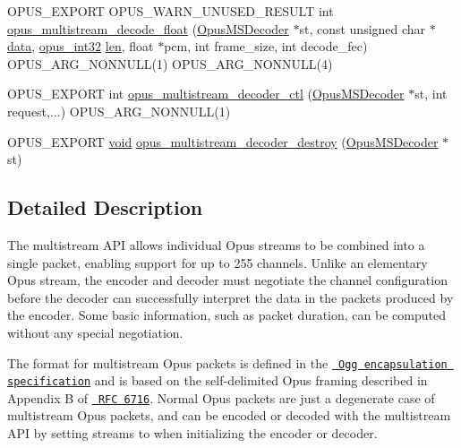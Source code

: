 \begin{DoxyCompactItemize}
\item 
O\+P\+U\+S\+\_\+\+E\+X\+P\+O\+RT O\+P\+U\+S\+\_\+\+W\+A\+R\+N\+\_\+\+U\+N\+U\+S\+E\+D\+\_\+\+R\+E\+S\+U\+LT int \mbox{\hyperlink{group__opus__multistream_ga32b004586f69b063a447e123e6a2c151}{opus\+\_\+multistream\+\_\+decode\+\_\+float}} (\mbox{\hyperlink{group__opus__multistream_gad3497495deb9a8ace82e76cd4f93e0e4}{Opus\+M\+S\+Decoder}} $\ast$st, const unsigned char $\ast$\mbox{\hyperlink{_s_d_l__opengl_8h_a2e335d56e2846b0fea47eed068b2d34a}{data}}, \mbox{\hyperlink{opus__types_8h_aa4d309d6f80b99dbabebc8f98879ab9a}{opus\+\_\+int32}} \mbox{\hyperlink{_s_d_l__opengl__glext_8h_a652168017ea9a8bbcead03d5c16269fb}{len}}, float $\ast$pcm, int frame\+\_\+size, int decode\+\_\+fec) O\+P\+U\+S\+\_\+\+A\+R\+G\+\_\+\+N\+O\+N\+N\+U\+LL(1) O\+P\+U\+S\+\_\+\+A\+R\+G\+\_\+\+N\+O\+N\+N\+U\+LL(4)
\item 
O\+P\+U\+S\+\_\+\+E\+X\+P\+O\+RT int \mbox{\hyperlink{group__opus__multistream_ga3c6402c3bb276d7a152d9934ce948431}{opus\+\_\+multistream\+\_\+decoder\+\_\+ctl}} (\mbox{\hyperlink{group__opus__multistream_gad3497495deb9a8ace82e76cd4f93e0e4}{Opus\+M\+S\+Decoder}} $\ast$st, int request,...) O\+P\+U\+S\+\_\+\+A\+R\+G\+\_\+\+N\+O\+N\+N\+U\+LL(1)
\item 
O\+P\+U\+S\+\_\+\+E\+X\+P\+O\+RT \mbox{\hyperlink{_s_d_l__opengles2__gl2ext_8h_ae5d8fa23ad07c48bb609509eae494c95}{void}} \mbox{\hyperlink{group__opus__multistream_ga314b439b06efd9463caa5039c1198f6c}{opus\+\_\+multistream\+\_\+decoder\+\_\+destroy}} (\mbox{\hyperlink{group__opus__multistream_gad3497495deb9a8ace82e76cd4f93e0e4}{Opus\+M\+S\+Decoder}} $\ast$st)
\end{DoxyCompactItemize}


\subsection{Detailed Description}
The multistream A\+PI allows individual Opus streams to be combined into a single packet, enabling support for up to 255 channels. Unlike an elementary Opus stream, the encoder and decoder must negotiate the channel configuration before the decoder can successfully interpret the data in the packets produced by the encoder. Some basic information, such as packet duration, can be computed without any special negotiation.

The format for multistream Opus packets is defined in the \href{http://tools.ietf.org/html/draft-terriberry-oggopus}{\texttt{ Ogg encapsulation specification}} and is based on the self-\/delimited Opus framing described in Appendix B of \href{http://tools.ietf.org/html/rfc6716}{\texttt{ R\+FC 6716}}. Normal Opus packets are just a degenerate case of multistream Opus packets, and can be encoded or decoded with the multistream A\+PI by setting {\ttfamily streams} to {} when initializing the encoder or decoder.

